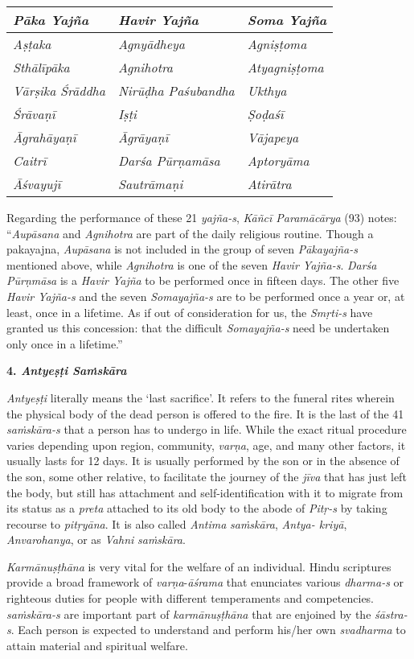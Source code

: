 \begin{longtable}{|l|l|l|}
\hline
\emph{\textbf{Pāka Yajña}} & \emph{\textbf{Havir Yajña}} & \emph{\textbf{Soma Yajña}}\tabularnewline
\hline
\emph{Aṣṭaka} & \emph{Agnyādheya} & \emph{Agniṣṭoma}\tabularnewline
\hline
\emph{Sthālīpāka} & \emph{Agnihotra} & \emph{Atyagniṣṭoma}\tabularnewline
\hline
\emph{Vārṣika Śrāddha} & \emph{Nirūḍha Paśubandha} & \emph{Ukthya}\tabularnewline
\hline
\emph{Śrāvaṇī} & \emph{Iṣṭi} & \emph{Ṣoḍaśī}\tabularnewline
\hline
\emph{Āgrahāyaṇī} & \emph{Āgrāyaṇī} & \emph{Vājapeya}\tabularnewline
\hline
\emph{Caitrī} & \emph{Darśa Pūrṇamāsa} & \emph{Aptoryāma}\tabularnewline
\hline
\emph{Āśvayujī} & \emph{Sautrāmaṇi} & \emph{Atirātra}\tabularnewline
\hline
\end{longtable}

Regarding the performance of these 21 \emph{yajña-s}, \emph{Kāñcī Paramācārya} (93) notes: ``\emph{Aupāsana} and \emph{Agnihotra} are part of the daily religious routine. Though a pakayajna, \emph{Aupāsana} is not included in the group of seven \emph{Pākayajña-s} mentioned above, while \emph{Agnihotra} is one of the seven \emph{Havir Yajña-s}. \emph{Darśa Pūrṇmāsa} is a \emph{Havir Yajña} to be performed once in fifteen days. The other five \emph{Havir Yajña-s} and the seven \emph{Somayajña-s} are to be performed once a year or, at least, once in a lifetime. As if out of consideration for us, the \emph{Smṛti-s} have granted us this concession: that the difficult \emph{Somayajña-s} need be undertaken only once in a lifetime.''

\textbf{4. \emph{Antyeṣṭi Saṁskāra}}

\emph{Antyeṣṭi} literally means the `last sacrifice'. It refers to the funeral rites wherein the physical body of the dead person is offered to the fire. It is the last of the 41 \emph{saṁskāra-s} that a person has to undergo in life. While the exact ritual procedure varies depending upon region, community, \emph{varṇa}, age, and many other factors, it usually lasts for 12 days. It is usually performed by the son or in the absence of the son, some other relative, to facilitate the journey of the \emph{jīva} that has just left the body, but still has attachment and self-identification with it to migrate from its status as a \emph{preta} attached to its old body to the abode of \emph{Pitṛ-s} by taking recourse to \emph{pitṛyāna}. It is also called \emph{Antima} \emph{saṁskāra}, \emph{Antya- kriyā}, \emph{Anvarohanya}, or as \emph{Vahni} \emph{saṁskāra}.

\emph{Karmānuṣṭhāna} is very vital for the welfare of an individual. Hindu scriptures provide a broad framework of \emph{varṇa}-\emph{āśrama} that enunciates various \emph{dharma-s} or righteous duties for people with different temperaments and competencies. \emph{saṁskāra-s} are important part of \emph{karmānuṣṭhāna} that are enjoined by the \emph{śāstra-s}. Each person is expected to understand and perform his/her own \emph{svadharma} to attain material and spiritual welfare.

